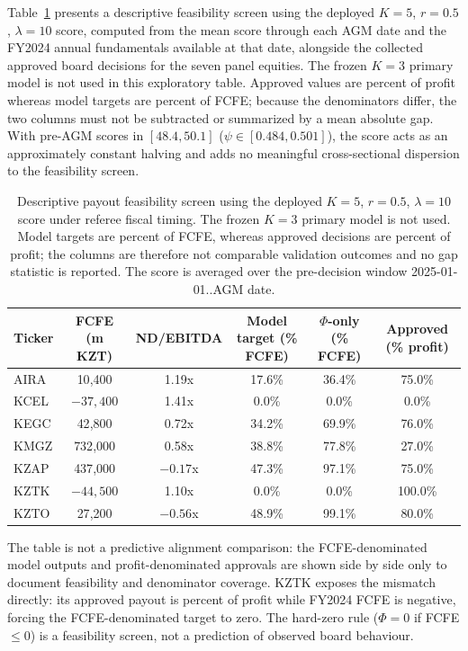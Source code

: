\documentclass[pdflatex,sn-mathphys-num]{sn-jnl}
\theoremstyle{thmstyleone}
\theoremstyle{thmstyletwo}
\theoremstyle{thmstylethree}
\begin{document}
Table~\ref{tab:h1_validation} presents a descriptive feasibility screen using the deployed $K=5$, $r=0.5$, $\lambda=10$ score, computed from the mean score through each AGM date and the FY2024 annual fundamentals available at that date, alongside the collected approved board decisions for the seven panel equities. The frozen $K=3$ primary model is not used in this exploratory table. Approved values are percent of profit whereas model targets are percent of FCFE; because the denominators differ, the two columns must not be subtracted or summarized by a mean absolute gap. With pre-AGM scores in $[48.4, 50.1]$ ($\psi \in [0.484, 0.501]$), the score acts as an approximately constant halving and adds no meaningful cross-sectional dispersion to the feasibility screen.
\begin{table}[htbp]
\centering
\small
\caption{Descriptive payout feasibility screen using the deployed $K=5$, $r=0.5$, $\lambda=10$ score under referee fiscal timing. The frozen $K=3$ primary model is not used. Model targets are percent of FCFE, whereas approved decisions are percent of profit; the columns are therefore not comparable validation outcomes and no gap statistic is reported. The score is averaged over the pre-decision window 2025-01-01..AGM date.}
\label{tab:h1_validation}
\begin{tabular}{@{}lccccc@{}}
\toprule
\textbf{Ticker} & \textbf{FCFE (m KZT)} & \textbf{ND/EBITDA} & \textbf{Model target (\% FCFE)} & \textbf{$\Phi$-only (\% FCFE)} & \textbf{Approved (\% profit)} \\
\midrule
AIRA & 10{,}400 & 1.19x & 17.6\% & 36.4\% & 75.0\% \\
KCEL & $-37{,}400$ & 1.41x & 0.0\% & 0.0\% & 0.0\% \\
KEGC & 42{,}800 & 0.72x & 34.2\% & 69.9\% & 76.0\% \\
KMGZ & 732{,}000 & 0.58x & 38.8\% & 77.8\% & 27.0\% \\
KZAP & 437{,}000 & $-0.17$x & 47.3\% & 97.1\% & 75.0\% \\
KZTK & $-44{,}500$ & 1.10x & 0.0\% & 0.0\% & 100.0\% \\
KZTO & 27{,}200 & $-0.56$x & 48.9\% & 99.1\% & 80.0\% \\
\bottomrule
\end{tabular}
\end{table}

The table is not a predictive alignment comparison: the FCFE-denominated model outputs and profit-denominated approvals are shown side by side only to document feasibility and denominator coverage. KZTK exposes the mismatch directly: its approved payout is percent of profit while FY2024 FCFE is negative, forcing the FCFE-denominated target to zero. The hard-zero rule ($\Phi = 0$ if FCFE $\le 0$) is a feasibility screen, not a prediction of observed board behaviour.
\end{document}
